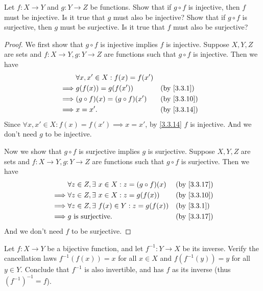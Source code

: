 \begin{ex}\label{ex:3.3.5}
  Let \(f : X \to Y\) and \(g : Y \to Z\) be functions.
  Show that if \(g \circ f\) is injective, then \(f\) must be injective.
  Is it true that \(g\) must also be injective?
  Show that if \(g \circ f\) is surjective, then \(g\) must be surjective.
  Is it true that \(f\) must also be surjective?
\end{ex}

\begin{proof}
  We first show that \(g \circ f\) is injective implies \(f\) is injective.
  Suppose \(X, Y, Z\) are sets and \(f : X \to Y, g : Y \to Z\) are functions such that \(g \circ f\) is injective.
  Then we have
  \begin{align*}
             & \forall x, x' \in X : f(x) = f(x')                                \\
    \implies & g(f(x)) = g(f(x'))                 &  & \text{(by \cref{3.3.1})}  \\
    \implies & (g \circ f)(x) = (g \circ f)(x')   &  & \text{(by \cref{3.3.10})} \\
    \implies & x = x'.                            &  & \text{(by \cref{3.3.14})}
  \end{align*}
  Since \(\forall x, x' \in X : f(x) = f(x') \implies x = x'\), by \cref{3.3.14} \(f\) is injective.
  And we don't need \(g\) to be injective.

  Now we show that \(g \circ f\) is surjective implies \(g\) is surjective.
  Suppose \(X, Y, Z\) are sets and \(f : X \to Y, g : Y \to Z\) are functions such that \(g \circ f\) is surjective.
  Then we have
  \begin{align*}
             & \forall z \in Z, \exists\ x \in X : z = (g \circ f)(x) &  & \text{(by \cref{3.3.17})} \\
    \implies & \forall z \in Z, \exists\ x \in X : z = g(f(x))        &  & \text{(by \cref{3.3.10})} \\
    \implies & \forall z \in Z, \exists\ f(x) \in Y : z = g(f(x))     &  & \text{(by \cref{3.3.1})}  \\
    \implies & g \text{ is surjective}.                               &  & \text{(by \cref{3.3.17})}
  \end{align*}
  And we don't need \(f\) to be surjective.
\end{proof}

\begin{ex}\label{ex:3.3.6}
  Let \(f : X \to Y\) be a bijective function, and let \(f^{-1} : Y \to X\) be its inverse.
  Verify the cancellation laws \(f^{-1}(f(x)) = x\) for all \(x \in X\) and \(f(f^{-1}(y)) = y\) for all \(y \in Y\).
  Conclude that \(f^{-1}\) is also invertible, and has \(f\) as its inverse (thus \((f^{-1})^{-1} = f\)).
\end{ex}

